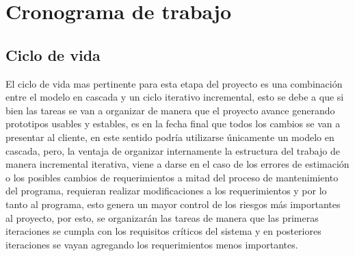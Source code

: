 \section{Cronograma de trabajo}

\subsection{Ciclo de vida}

El ciclo de vida mas pertinente para esta etapa del proyecto es una combinación entre el modelo en cascada y un ciclo iterativo incremental, esto se debe a que si bien las tareas se van a organizar de manera que el proyecto avance generando prototipos usables y estables, es en la fecha final que todos los cambios se van a presentar al cliente, en este sentido podría utilizarse únicamente un modelo en cascada, pero, la ventaja de organizar internamente la estructura del trabajo de manera incremental iterativa, viene a darse en el caso de los errores de estimación o los posibles cambios de requerimientos a mitad del proceso de mantenimiento del programa, requieran realizar modificaciones a los requerimientos y por lo tanto al programa, esto genera un mayor control de los riesgos más importantes al proyecto, por esto, se organizarán las tareas de manera que las primeras iteraciones se cumpla con los requisitos críticos del sistema y en posteriores iteraciones se vayan agregando los requerimientos menos importantes.